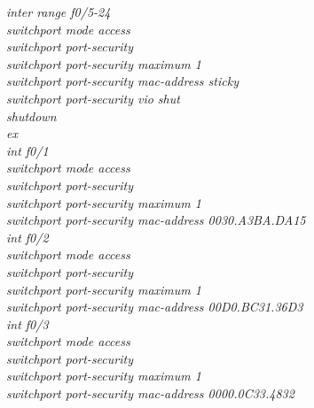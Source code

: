\documentclass[a4paper, 12pt]{article}
\begin{document}
\hspace*{2cm}\textit{inter range f0/5-24\\
\hspace*{2cm}switchport mode access\\
\hspace*{2cm}switchport port-security\\
\hspace*{2cm}switchport port-security maximum 1\\
\hspace*{2cm}switchport port-security mac-address sticky\\
\hspace*{2cm}switchport port-security vio shut\\
\hspace*{2cm}shutdown\\
\hspace*{2cm}ex\\
\hspace*{2cm}int f0/1\\
\hspace*{2cm}switchport mode access\\
\hspace*{2cm}switchport port-security\\
\hspace*{2cm}switchport port-security maximum 1\\
\hspace*{2cm}switchport port-security mac-address 0030.A3BA.DA15\\
\hspace*{2cm}int f0/2\\
\hspace*{2cm}switchport mode access\\
\hspace*{2cm}switchport port-security\\
\hspace*{2cm}switchport port-security maximum 1\\
\hspace*{2cm}switchport port-security mac-address 00D0.BC31.36D3\\
\hspace*{2cm}int f0/3\\
\hspace*{2cm}switchport mode access\\
\hspace*{2cm}switchport port-security\\
\hspace*{2cm}switchport port-security maximum 1\\
\hspace*{2cm}switchport port-security mac-address 0000.0C33.4832\\}
\end{document}
